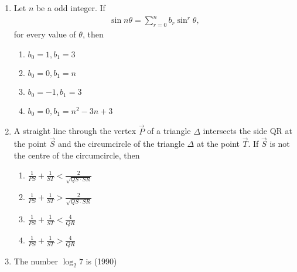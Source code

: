 \begin{enumerate}[label=\thesubsection.\arabic*,ref=\thesubsection.\theenumi]
\begin{multicols}{4}
\begin{multicols}{4}
\begin{enumerate}
\item $xyz=xz+y$
\item $xyz=xy+z$
\item $xyz=x+y+z$
\item $xyz+yz+x$
\end{enumerate}
\end{multicols}
\end{multicols}
\item Let $n$ be a odd integer. If 
\begin{align*}
\sin n\theta= \sum_{r=0}^{n} b_r \sin^{r} \theta,  
\end{align*}
for every value of $\theta$,  then
\hfill{}
\begin{multicols}{2}
\begin{multicols}{4}
\begin{enumerate}    
\item $b_0=1,  b_1=3$
\item $b_0=0,  b_1=n$
\item $b_0=-1,  b_1=3$
\item $b_0=0,  b_1=n^2-3n+3$
\end{enumerate}
\end{multicols}
\end{multicols}
%
\item A straight line through the vertex $\vec{P}$ of a triangle $\Delta$ intersects the side QR at the point $\vec{S}$ and the circumcircle of the triangle $\Delta$ at the point $\vec{T}$. If $\vec{S}$ is not the centre of the circumcircle, then  \hfill{}
\begin{multicols}{2}
\begin{multicols}{4}
\begin{enumerate}    
\item $\frac{1}{PS}+\frac{1}{ST}<\frac{2}{\sqrt{QS \cdot SR}}$
\item $\frac{1}{PS}+\frac{1}{ST}>\frac{2}{\sqrt{QS \cdot SR}}$
\item $\frac{1}{PS}+\frac{1}{ST}<\frac{4}{QR}$
\item $\frac{1}{PS}+\frac{1}{ST}>\frac{4}{QR}$
\end{enumerate}
\end{multicols}
\end{multicols}
\item The number ${\log_2}7$ is \hfill(1990)
    \begin{multicols}{2}
    \begin{multicols}{4}
\begin{enumerate}    

\end{enumerate}
\end{multicols}
\end{multicols}
\end{enumerate}
